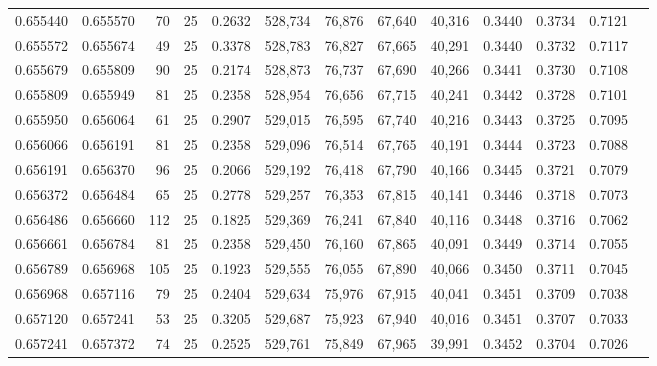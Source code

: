 \begin{tabular}{rrrrrrrrrrrrr}
0.655440 & 0.655570 &    70 &  25 &                                     0.2632 & 528,734 &  76,876 &  67,640 &  40,316 & 0.3440 & 0.3734 & 0.7121 \\
0.655572 & 0.655674 &    49 &  25 &                                     0.3378 & 528,783 &  76,827 &  67,665 &  40,291 & 0.3440 & 0.3732 & 0.7117 \\
0.655679 & 0.655809 &    90 &  25 &                                     0.2174 & 528,873 &  76,737 &  67,690 &  40,266 & 0.3441 & 0.3730 & 0.7108 \\
0.655809 & 0.655949 &    81 &  25 &                                     0.2358 & 528,954 &  76,656 &  67,715 &  40,241 & 0.3442 & 0.3728 & 0.7101 \\
0.655950 & 0.656064 &    61 &  25 &                                     0.2907 & 529,015 &  76,595 &  67,740 &  40,216 & 0.3443 & 0.3725 & 0.7095 \\
0.656066 & 0.656191 &    81 &  25 &                                     0.2358 & 529,096 &  76,514 &  67,765 &  40,191 & 0.3444 & 0.3723 & 0.7088 \\
0.656191 & 0.656370 &    96 &  25 &                                     0.2066 & 529,192 &  76,418 &  67,790 &  40,166 & 0.3445 & 0.3721 & 0.7079 \\
0.656372 & 0.656484 &    65 &  25 &                                     0.2778 & 529,257 &  76,353 &  67,815 &  40,141 & 0.3446 & 0.3718 & 0.7073 \\
0.656486 & 0.656660 &   112 &  25 &                                     0.1825 & 529,369 &  76,241 &  67,840 &  40,116 & 0.3448 & 0.3716 & 0.7062 \\
0.656661 & 0.656784 &    81 &  25 &                                     0.2358 & 529,450 &  76,160 &  67,865 &  40,091 & 0.3449 & 0.3714 & 0.7055 \\
0.656789 & 0.656968 &   105 &  25 &                                     0.1923 & 529,555 &  76,055 &  67,890 &  40,066 & 0.3450 & 0.3711 & 0.7045 \\
0.656968 & 0.657116 &    79 &  25 &                                     0.2404 & 529,634 &  75,976 &  67,915 &  40,041 & 0.3451 & 0.3709 & 0.7038 \\
0.657120 & 0.657241 &    53 &  25 &                                     0.3205 & 529,687 &  75,923 &  67,940 &  40,016 & 0.3451 & 0.3707 & 0.7033 \\
0.657241 & 0.657372 &    74 &  25 &                                     0.2525 & 529,761 &  75,849 &  67,965 &  39,991 & 0.3452 & 0.3704 & 0.7026 \\

\end{tabular}
